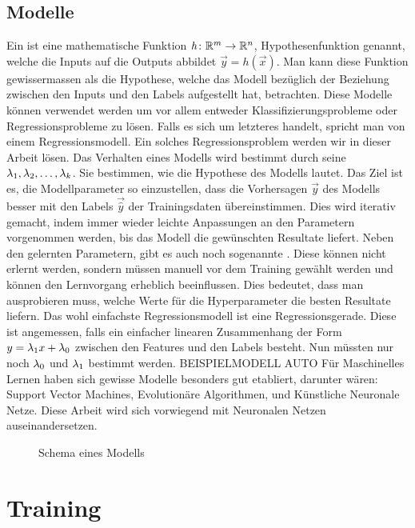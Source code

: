 \subsection{Modelle}
Ein  ist eine mathematische Funktion $\mathit{h}\colon \mathbb{R}^m
\to \mathbb{R}^n$, Hypothesenfunktion genannt, welche die Inputs auf die Outputs abbildet $\vec{y}=\mathit{h}(\vec{x})$.
Man kann diese Funktion gewissermassen als die Hypothese, welche das Modell bezüglich der Beziehung zwischen
den Inputs und den Labels aufgestellt hat, betrachten.
Diese Modelle können verwendet werden um vor allem entweder
Klassifizierungsprobleme oder Regressionsprobleme zu lösen. Falls es sich um
letzteres handelt, spricht man von einem Regressionsmodell. Ein solches
Regressionsproblem werden wir in dieser Arbeit lösen.
\para{}
Das Verhalten eines Modells wird bestimmt durch seine 
$\lambda_1, \lambda_2,\ldots,\lambda_k$. Sie bestimmen, wie die Hypothese des Modells lautet.
Das Ziel ist es, die Modellparameter so einzustellen, dass die Vorhersagen
$\vec{y}$ des Modells besser mit den Labels $\vec{\hat{y}}$ der Trainingsdaten übereinstimmen.
Dies wird iterativ gemacht, indem immer wieder leichte Anpassungen an den
Parametern vorgenommen werden, bis das Modell die gewünschten Resultate liefert.
\para{}
Neben den gelernten Parametern, gibt es auch noch sogenannte .
Diese können nicht erlernt werden, sondern müssen manuell vor dem Training gewählt werden und können den Lernvorgang erheblich beeinflussen.
Dies bedeutet, dass man ausprobieren muss, welche Werte für die Hyperparameter
die besten Resultate liefern.
\para{}
Das wohl einfachste Regressionsmodell ist eine Regressionsgerade. Diese ist
angemessen, falls ein einfacher linearen Zusammenhang der Form $y=\lambda_1x +
\lambda_0$ zwischen den Features und den Labels besteht.
Nun müssten nur noch $\lambda_0$ und $\lambda_1$ bestimmt werden.
BEISPIELMODELL AUTO
\para{}
Für Maschinelles Lernen haben sich gewisse Modelle besonders gut etabliert,
darunter wären: Support Vector Machines, Evolutionäre Algorithmen, und Künstliche Neuronale Netze.
Diese Arbeit wird sich vorwiegend mit Neuronalen Netzen auseinandersetzen.
\\
\begin{figure}[h!]
  \centering


  \caption{Schema eines Modells}
\end{figure}

\section{Training}
